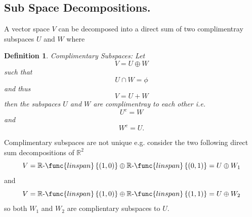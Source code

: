 \documentclass[aps,preprint]{revtex4}
\newtheorem{definition}[theorem]{Definition}
\begin{document}
\subsection{Sub Space Decompositions.}

A vector space $V$ can be decomposed into a direct sum of two complimentray
subspaces $U$ and $W$ where

\begin{definition}
Complimentary Subspaces: Let 
\begin{equation}
V=U\oplus W
\end{equation}%
such that 
\begin{equation}
U\cap W=\phi
\end{equation}%
and thus 
\begin{equation}
V=U+W
\end{equation}%
then the subspaces $U$ and $W$ are complimentray to each other i.e.%
\begin{equation}
U^{c}=W
\end{equation}%
and 
\begin{equation}
W^{c}=U.
\end{equation}
\end{definition}

Complimentary subspaces are not unique e.g. consider the two following
direct sum decompositions of $\mathbb{R}^{2}$ 
\begin{equation}
V=\mathbb{R}\text{-}\func{linspan}\left\{ \left( 1,0\right) \right\} \oplus 
\mathbb{R}\text{-}\func{linspan}\left\{ \left( 0,1\right) \right\} =U\oplus
W_{1}
\end{equation}%
and 
\begin{equation}
V=\mathbb{R}\text{-}\func{linspan}\left\{ \left( 1,0\right) \right\} \oplus 
\mathbb{R}\text{-}\func{linspan}\left\{ \left( 1,1\right) \right\} =U\oplus
W_{2}
\end{equation}%
so both $W_{1}$ and $W_{2}$ are complientary subspaces to $U.$
\end{document}
